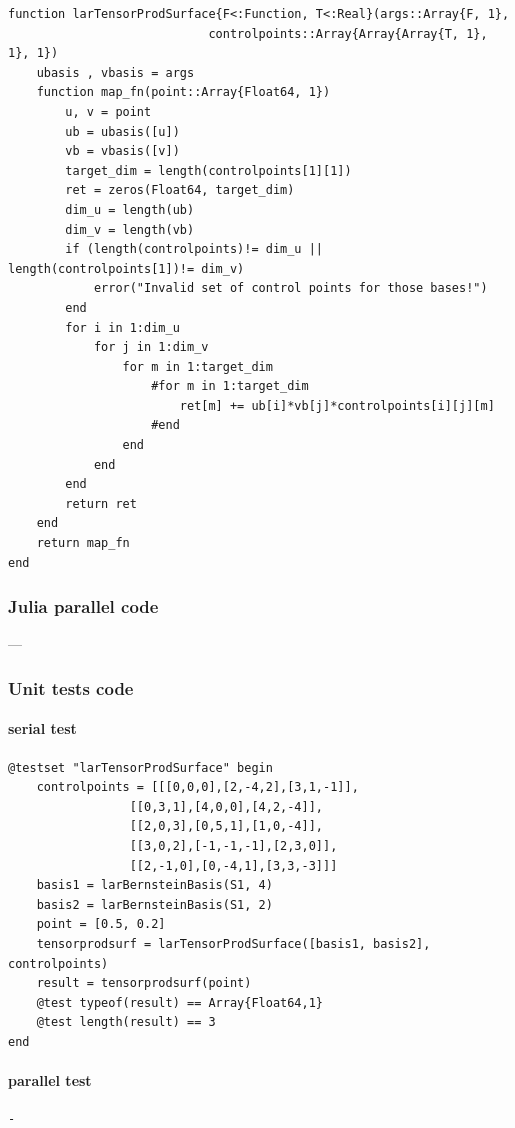 \documentclass[a4paper,11pt]{article}
\begin{document}
\begin{verbatim}
function larTensorProdSurface{F<:Function, T<:Real}(args::Array{F, 1}, 
                            controlpoints::Array{Array{Array{T, 1}, 1}, 1})
    ubasis , vbasis = args
    function map_fn(point::Array{Float64, 1})
        u, v = point
        ub = ubasis([u])
        vb = vbasis([v])
        target_dim = length(controlpoints[1][1])
        ret = zeros(Float64, target_dim)
        dim_u = length(ub)
        dim_v = length(vb)
        if (length(controlpoints)!= dim_u || length(controlpoints[1])!= dim_v)
            error("Invalid set of control points for those bases!") 
        end
        for i in 1:dim_u
            for j in 1:dim_v
                for m in 1:target_dim
                    #for m in 1:target_dim 
                        ret[m] += ub[i]*vb[j]*controlpoints[i][j][m]
                    #end
                end
            end
        end
        return ret
    end
    return map_fn
end
\end{verbatim}

\subsubsection{Julia parallel code}
---

\subsubsection{Unit tests code}

\paragraph{serial test}
\begin{verbatim}
@testset "larTensorProdSurface" begin
    controlpoints = [[[0,0,0],[2,-4,2],[3,1,-1]],
                 [[0,3,1],[4,0,0],[4,2,-4]],
                 [[2,0,3],[0,5,1],[1,0,-4]],
                 [[3,0,2],[-1,-1,-1],[2,3,0]],
                 [[2,-1,0],[0,-4,1],[3,3,-3]]]
    basis1 = larBernsteinBasis(S1, 4) 
    basis2 = larBernsteinBasis(S1, 2) 
    point = [0.5, 0.2]
    tensorprodsurf = larTensorProdSurface([basis1, basis2], controlpoints)
    result = tensorprodsurf(point)
    @test typeof(result) == Array{Float64,1}
    @test length(result) == 3
end
\end{verbatim}

\paragraph{parallel test}
\begin{verbatim}
-
\end{verbatim}
\end{document}
